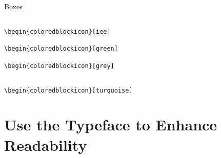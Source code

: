 \documentclass[aspectratio=169]{beamer}
\begin{document}
\begin{frame}{Boxes}
\begin{columns}
\begin{column}{0.49\textwidth}
            \begin{coloredblockicon}
                \footnotesize\texttt{\textbackslash begin\{coloredblockicon\}[iee]}\strut
            \end{coloredblockicon}
    
            \begin{coloredblockicon}
                \footnotesize\texttt{\textbackslash begin\{coloredblockicon\}[green]}\strut
            \end{coloredblockicon}
    
            \begin{coloredblockicon}
                \footnotesize\texttt{\textbackslash begin\{coloredblockicon\}[grey]}\strut
            \end{coloredblockicon}
        
        \end{column}
    \end{columns}

    \centering
    \begin{minipage}[t]{0.49\textwidth}
        \begin{coloredblockicon}
            \vspace{0.2cm}
            \footnotesize\texttt{\textbackslash begin\{coloredblockicon\}[turquoise]}\strut
        \end{coloredblockicon}
        
    \end{minipage}
\end{frame}


\section{Use the \textbf{Typeface} to Enhance Readability}

\begin{frame}
    \agenda     
\end{frame}
\end{document}
